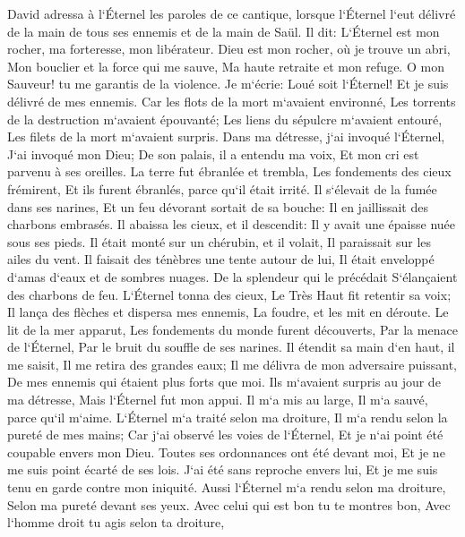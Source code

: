 \verse David adressa à l`Éternel les paroles de ce cantique, lorsque l`Éternel l`eut délivré de la main de tous ses ennemis et de la main de Saül. 
\verse Il dit: L`Éternel est mon rocher, ma forteresse, mon libérateur. 
\verse Dieu est mon rocher, où je trouve un abri, Mon bouclier et la force qui me sauve, Ma haute retraite et mon refuge. O mon Sauveur! tu me garantis de la violence. 
\verse Je m`écrie: Loué soit l`Éternel! Et je suis délivré de mes ennemis. 
\verse Car les flots de la mort m`avaient environné, Les torrents de la destruction m`avaient épouvanté; 
\verse Les liens du sépulcre m`avaient entouré, Les filets de la mort m`avaient surpris. 
\verse Dans ma détresse, j`ai invoqué l`Éternel, J`ai invoqué mon Dieu; De son palais, il a entendu ma voix, Et mon cri est parvenu à ses oreilles. 
\verse La terre fut ébranlée et trembla, Les fondements des cieux frémirent, Et ils furent ébranlés, parce qu`il était irrité. 
\verse Il s`élevait de la fumée dans ses narines, Et un feu dévorant sortait de sa bouche: Il en jaillissait des charbons embrasés. 
\verse Il abaissa les cieux, et il descendit: Il y avait une épaisse nuée sous ses pieds. 
\verse Il était monté sur un chérubin, et il volait, Il paraissait sur les ailes du vent. 
\verse Il faisait des ténèbres une tente autour de lui, Il était enveloppé d`amas d`eaux et de sombres nuages. 
\verse De la splendeur qui le précédait S`élançaient des charbons de feu. 
\verse L`Éternel tonna des cieux, Le Très Haut fit retentir sa voix; 
\verse Il lança des flèches et dispersa mes ennemis, La foudre, et les mit en déroute. 
\verse Le lit de la mer apparut, Les fondements du monde furent découverts, Par la menace de l`Éternel, Par le bruit du souffle de ses narines. 
\verse Il étendit sa main d`en haut, il me saisit, Il me retira des grandes eaux; 
\verse Il me délivra de mon adversaire puissant, De mes ennemis qui étaient plus forts que moi. 
\verse Ils m`avaient surpris au jour de ma détresse, Mais l`Éternel fut mon appui. 
\verse Il m`a mis au large, Il m`a sauvé, parce qu`il m`aime. 
\verse L`Éternel m`a traité selon ma droiture, Il m`a rendu selon la pureté de mes mains; 
\verse Car j`ai observé les voies de l`Éternel, Et je n`ai point été coupable envers mon Dieu. 
\verse Toutes ses ordonnances ont été devant moi, Et je ne me suis point écarté de ses lois. 
\verse J`ai été sans reproche envers lui, Et je me suis tenu en garde contre mon iniquité. 
\verse Aussi l`Éternel m`a rendu selon ma droiture, Selon ma pureté devant ses yeux. 
\verse Avec celui qui est bon tu te montres bon, Avec l`homme droit tu agis selon ta droiture, 
